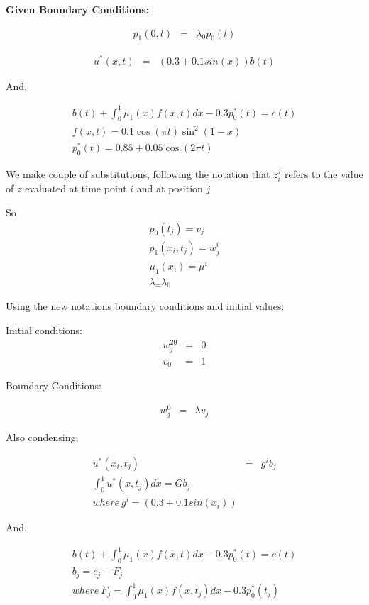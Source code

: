 \documentclass{ifacconf}
\begin{document}
\textbf{Given Boundary Conditions:}

\begin{eqnarray}
p_1(0,t) &=& \lambda_0 p_0(t)
\end{eqnarray}

\begin{eqnarray}
u^{*}(x,t) &=& (0.3+0.1 sin(x))b(t) 
\end{eqnarray}

And,

\begin{eqnarray}
b(t)+\int_0^1\mu_1(x)f(x,t)dx -0.3p_0^{*}(t) = c(t)\\
f(x,t) = 0.1\cos(\pi t)\sin^2(1-x)\\
p_0^{*}(t) = 0.85+0.05\cos(2\pi t)
\end{eqnarray}



We make couple of substitutions, following the notation that
$z_i^j$ refers to the value of $z$ evaluated at time point $i$ and at position $j$

So 
\begin{eqnarray}
p_0(t_j) = v_j \nonumber \\
p_1(x_i,t_j) = w_j^i \\
\mu_1(x_i) = \mu^i \\
\lambda_ = \lambda_0
\end{eqnarray} 


Using the new notations boundary conditions and initial values:


Initial conditions:
\begin{eqnarray}
w_j^{20} &=& 0\\
v_0 &=& 1
\end{eqnarray}

Boundary Conditions:

\begin{eqnarray}
w_j^0 &=&  \lambda v_j
\end{eqnarray}

Also condensing,


\begin{eqnarray}
u^{*}(x_i,t_j) &=& g^ib_j \\
\int_0^1 u^{*}(x,t_j)dx = Gb_j\\
where\ g^i = (0.3+0.1sin(x_i)) \nonumber
\end{eqnarray}

And,

\begin{eqnarray}
b(t)+\int_0^1\mu_1(x)f(x,t)dx -0.3p_0^{*}(t) = c(t) \nonumber \\
b_j = c_j - F_j \\
where\ F_j = \int_0^1\mu_1(x)f(x,t_j)dx -0.3p_0^{*}(t_j)\\
\end{eqnarray}
\end{document}

